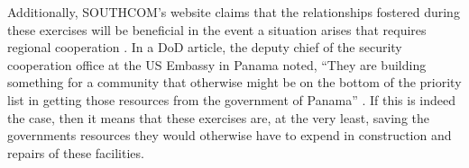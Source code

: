 \documentclass[12pt]{article}
\begin{document}
\begin{doublespace}



 

Additionally, SOUTHCOM's website claims that the relationships fostered during these exercises will be beneficial in the event a situation arises that requires regional cooperation \cite{Miles2013}. In a DoD article, the deputy chief of the security cooperation office at the US Embassy in Panama noted, ``They are building something for a community that otherwise might be on the bottom of the priority list in getting those resources from the government of Panama'' \cite{Miles2013}. If this is indeed the case, then it means that these exercises are, at the very least, saving the governments resources they would otherwise have to expend in construction and repairs of these facilities. 




\end{doublespace}
\end{document}

